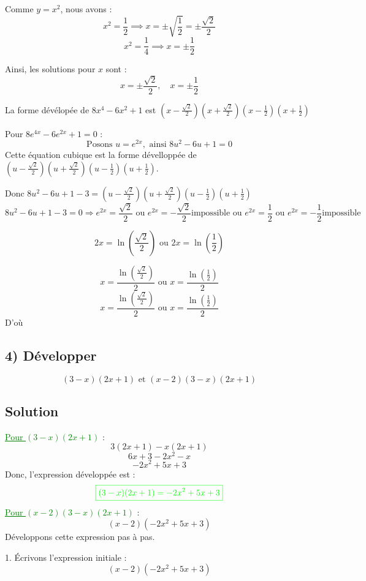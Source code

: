 \documentclass[12pt]{article}
\begin{document}
Comme \(y = x^2\), nous avons :
\[
x^2 = \frac{1}{2} \implies x = \pm \sqrt{\frac{1}{2}} = \pm \frac{\sqrt{2}}{2}
\]
\[
x^2 = \frac{1}{4} \implies x = \pm \frac{1}{2}
\]

Ainsi, les solutions pour \(x\) sont :
\[
x = \pm \frac{\sqrt{2}}{2}, \quad x = \pm \frac{1}{2}
\]

\textcolor{green}{}

La forme dévélopée de \(8x^4 - 6x^2 + 1\) est \((x-\frac{\sqrt{2}}{2})(x+\frac{\sqrt{2}}{2})(x-\frac{1}{2})(x+\frac{1}{2})\)

Pour \(8e^{4x} - 6e^{2x} + 1 = 0\) :
\[
\text{Posons } u = e^{2x}, \text{ ainsi } 8u^2 - 6u + 1 = 0
\]
Cette équation cubique est la forme dévelloppée de \((u-\frac{\sqrt{2}}{2})(u+\frac{\sqrt{2}}{2})(u-\frac{1}{2})(u+\frac{1}{2})\).

Donc $8u^2 - 6u + 1 - 3=(u-\frac{\sqrt{2}}{2})(u+\frac{\sqrt{2}}{2})(u-\frac{1}{2})(u+\frac{1}{2})$
\[
8u^2 - 6u + 1 - 3 = 0 \Longrightarrow e^{2x}=\frac{\sqrt{2}}{2} \text{ ou } e^{2x}=-\frac{\sqrt{2}}{2} \text{impossible ou } e^{2x}=\frac{1}{2} \text{ ou } e^{2x}=-\frac{1}{2} \text{impossible}
\]

\[
2x=\ln(\frac{\sqrt{2}}{2}) \text{ ou } 2x=\ln(\frac{1}{2})
\]

\[
x=\frac{\ln(\frac{\sqrt{2}}{2})}{2} \text{ ou } x=\frac{\ln(\frac{1}{2})}{2}
\]
\[
x=\frac{\ln(\frac{\sqrt{2}}{2})}{2} \text{ ou } x=\frac{\ln(\frac{1}{2})}{2}
\]
D'où \textcolor{green}{}

\subsection*{4) Développer } 
\[
(3-x)(2x+1) \text{ et } (x-2)(3-x)(2x+1)
\]

\subsection*{Solution}
\textcolor{green}{\underline{Pour \((3-x)(2x+1)\)} }:
\[
3(2x+1) - x(2x+1)
\]
\[
6x + 3 - 2x^2 - x
\]
\[
-2x^2 + 5x + 3
\]
Donc, l'expression développée est :
\[\textcolor{green}{\boxed{
(3-x)(2x+1) = -2x^2 + 5x + 3
}}\]
\textcolor{green}{\underline{Pour \((x-2)(3-x)(2x+1)\)} }:
\[
(x-2)(-2x^2 + 5x + 3)
\]
Développons cette expression pas à pas.

1. Écrivons l'expression initiale :
\[
(x-2)(-2x^2 + 5x + 3)
\]
\end{document}
